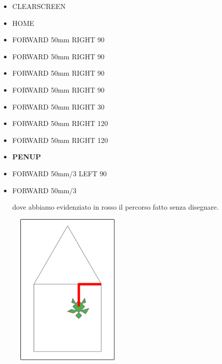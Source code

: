 \begin{scriptsize}
\begin{minipage}{0.40\textwidth}
\begin{itemize}[itemsep=-3pt,parsep=2pt]
\item[] CLEARSCREEN             
\item[] HOME
\item[] FORWARD 50mm RIGHT 90
\item[] FORWARD 50mm RIGHT 90
\item[] FORWARD 50mm RIGHT 90
\item[] FORWARD 50mm RIGHT 90
\item[] FORWARD 50mm RIGHT 30
\item[] FORWARD 50mm RIGHT 120
\item[] FORWARD 50mm RIGHT 120
\item[] \textbf{PENUP}
\item[] FORWARD 50mm/3 LEFT 90
\item[] FORWARD 50mm/3

dove abbiamo evidenziato in rosso il percorso fatto senza disegnare.
\end{itemize}
\end{minipage}
\end{scriptsize}
\begin{minipage}{0.4\textwidth}
\begin{figure}[H]
   \includegraphics[width=5.0cm,trim=4 4 8 4,clip]{./images/disegnare/disegnare-8.png}
   \label{dis-8}
\end{figure}
\end{minipage} \hfill

\vskip 1cm

